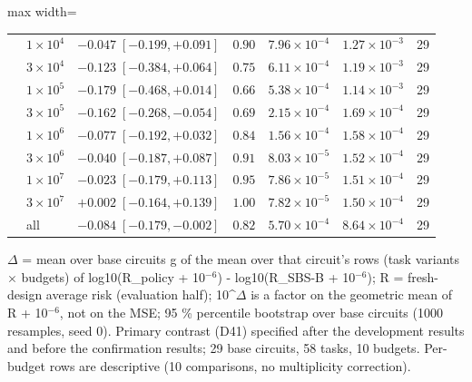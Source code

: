 \begin{table}[htbp]
\begin{adjustbox}{max width=\textwidth}
\begin{tabular}{llrrrrr}
 & $1\times10^{4}$ & $-0.047\;[-0.199,+0.091]$ & $0.90$ & $7.96\times10^{-4}$ & $1.27\times10^{-3}$ & 29 \\
 & $3\times10^{4}$ & $-0.123\;[-0.384,+0.064]$ & $0.75$ & $6.11\times10^{-4}$ & $1.19\times10^{-3}$ & 29 \\
 & $1\times10^{5}$ & $-0.179\;[-0.468,+0.014]$ & $0.66$ & $5.38\times10^{-4}$ & $1.14\times10^{-3}$ & 29 \\
 & $3\times10^{5}$ & $-0.162\;[-0.268,-0.054]$ & $0.69$ & $2.15\times10^{-4}$ & $1.69\times10^{-4}$ & 29 \\
 & $1\times10^{6}$ & $-0.077\;[-0.192,+0.032]$ & $0.84$ & $1.56\times10^{-4}$ & $1.58\times10^{-4}$ & 29 \\
 & $3\times10^{6}$ & $-0.040\;[-0.187,+0.087]$ & $0.91$ & $8.03\times10^{-5}$ & $1.52\times10^{-4}$ & 29 \\
 & $1\times10^{7}$ & $-0.023\;[-0.179,+0.113]$ & $0.95$ & $7.86\times10^{-5}$ & $1.51\times10^{-4}$ & 29 \\
 & $3\times10^{7}$ & $+0.002\;[-0.164,+0.139]$ & $1.00$ & $7.82\times10^{-5}$ & $1.50\times10^{-4}$ & 29 \\
 & all & $-0.084\;[-0.179,-0.002]$ & $0.82$ & $5.70\times10^{-4}$ & $8.64\times10^{-4}$ & 29 \\
\bottomrule
\end{tabular}\end{adjustbox}
\par\vspace{0.5em}
\begin{minipage}{0.97\linewidth}
\footnotesize $\Delta$ = mean over base circuits g of the mean over that circuit's rows (task variants $\times$ budgets) of log10(R\_policy + 10$^{-6}$) - log10(R\_SBS-B + 10$^{-6}$); R = fresh-design average risk (evaluation half); 10\textasciicircum{}$\Delta$ is a factor on the geometric mean of R + 10$^{-6}$, not on the MSE; 95 \% percentile bootstrap over base circuits (1000 resamples, seed 0). Primary contrast (D41) specified after the development results and before the confirmation results; 29 base circuits, 58 tasks, 10 budgets. Per-budget rows are descriptive (10 comparisons, no multiplicity correction).
\end{minipage}
\end{table}
